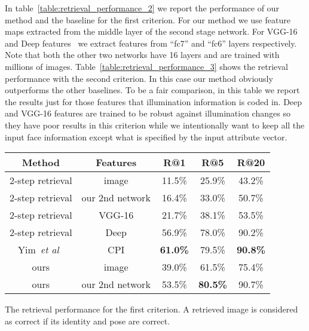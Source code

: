 \documentclass[10pt,twocolumn,letterpaper]{article}
\def\etal{\emph{et al}\onedot}
\begin{document}
In table~\ref{table:retrieval_performance_2} we report the performance of our method and the baseline for the first criterion. For our method we use feature maps extracted from the middle layer of the second stage network. 
For VGG-16~\cite{Simonyan-iclr15} and Deep features~\cite{Parkhi-bmvc15} we extract features from ``fc7'' and ``fc6'' layers respectively. Note that both the other two networks have 16 layers and are trained with millions of images. 
Table~\ref{table:retrieval_performance_3} shows the retrieval performance with the second criterion. In this case our method obviously outperforms the other baselines. 
To be a fair comparison, in this table we report the results just for those features that illumination information is coded in. Deep and VGG-16 features are trained to be robust against illumination changes so they have poor results in this criterion while we intentionally want to keep all the input face information except what is specified by the input attribute vector.
\begin{center}{\small
{
\begin{tabular}{|c|c|c|c|c|}
\hline
Method & Features & R@1 & R@5 & R@20\\
\hline\hline
{2-step retrieval}	& image		& 11.5\% & 25.9\% & 43.2\% \\
{2-step retrieval}	& our 2nd network	& 16.4\% & 33.0\% & 50.7\% \\
{2-step retrieval}	& VGG-16	& 21.7\% & 38.1\% & 53.5\% \\
{2-step retrieval}	& Deep		& 56.9\% & 78.0\% & 90.2\% \\
\hline
Yim~\etal~\cite{Yim-cvpr15} & CPI 	& \bf{61.0}\% & 79.5\% & \bf{90.8}\% \\
\hline
{ours}			& image		& 39.0\% & 61.5\% & 75.4\% \\
{ours}			& our 2nd network	& 53.5\% & \bf{80.5}\% & 90.7\% \\
\hline
\end{tabular}
}
}
\end{center}
\caption{The retrieval performance for the first criterion. A retrieved image is considered as correct if its identity and pose are correct.}
\label{table:retrieval_performance_2}
\end{document}
